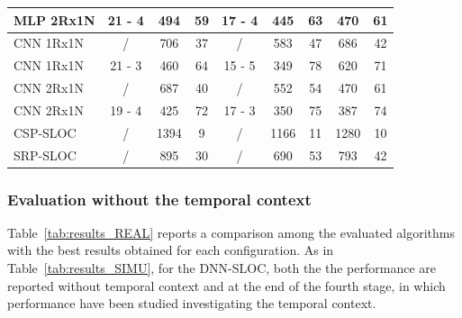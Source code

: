 \documentclass[review]{elsarticle}
\newcommand{\tableref}[1]{Table~\ref{#1}}
\begin{document}
\begin{table}[!h]
{\begin{tabular}{l|ccc|ccc|cc}
			MLP 2Rx1N & 21 - 4                      & 494                      & 59                            & 17 - 4                      & 445                      & 63                            & 470                      & 61                            \\ \hline
			CNN 1Rx1N & /                          & 706                      & 37                            & /                          & 583                      & 47                            & 686                      & 42                            \\
			CNN 1Rx1N & 21 - 3                      & 460                      & 64                            & 15 - 5                      & 349                      & 78                            & 620                      & 71                            \\ \hline
			CNN 2Rx1N & /                          & 687                      & 40                            & /                          & 552                      & 54                            & 470                      & 61                            \\
			CNN 2Rx1N & 19 - 4                      & 425                      & 72                            & 17 - 3                      & 350                      & 75                            & 387                      & 74                            \\ \hline
			CSP-SLOC  & /                          & 1394                     & 9                             & /                          & 1166                     & 11                            & 1280                     & 10                            \\ \hline
			SRP-SLOC  & /                          & 895                      & 30                            & /                          & 690                      & 53                            & 793                      & 42                                                  
			
		\end{tabular}
	}
\end{table}


\subsubsection{Evaluation without the temporal context}
\tableref{tab:results_REAL} reports a comparison among the evaluated algorithms with the best results obtained for each configuration. As in \tableref{tab:results_SIMU}, for the DNN-SLOC, both the the performance are reported without temporal context and at the end of the fourth stage, in which performance have been studied investigating the temporal context.
\end{document}
